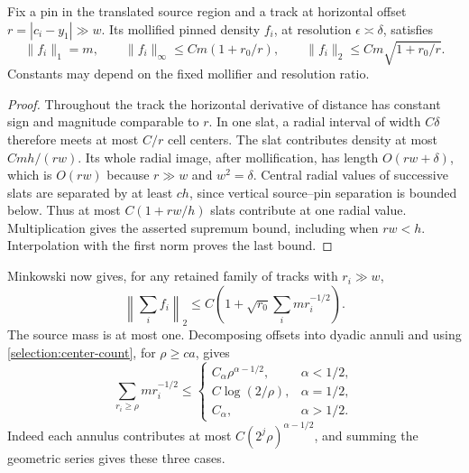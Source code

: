 \begin{lemma}\label{selection:one-track}
Fix a pin in the translated source region and a track at horizontal offset
\(r=|c_i-y_1|\gg w\). Its mollified pinned density \(f_i\), at
resolution \(\epsilon\asymp\delta\), satisfies
\[
 \|f_i\|_1=m,\qquad
 \|f_i\|_\infty\le Cm(1+r_0/r),\qquad
 \|f_i\|_2\le Cm\sqrt{1+r_0/r}.
\]
Constants may depend on the fixed mollifier and resolution ratio.
\end{lemma}
\begin{proof}
Throughout the track the horizontal derivative of distance has constant
sign and magnitude comparable to \(r\). In one slat, a radial interval
of width \(C\delta\) therefore meets at most \(C/r\) cell centers.
The slat contributes density at most \(Cm h/(rw)\).
Its whole radial image, after mollification, has length \(O(rw+\delta)\),
which is \(O(rw)\) because \(r\gg w\) and \(w^2=\delta\).
Central radial values of successive slats are separated by at least
\(ch\), since vertical source--pin separation is bounded below.
Thus at most \(C(1+rw/h)\) slats contribute at one radial value.
Multiplication gives the asserted supremum bound, including when
\(rw<h\). Interpolation with the first norm proves the last bound.
\end{proof}

Minkowski now gives, for any retained family of tracks with \(r_i\gg w\),
\begin{equation}\label{selection:half-potential}
 \left\|\sum_i f_i\right\|_2
 \le C\left(1+\sqrt{r_0}\sum_i m r_i^{-1/2}\right).
\end{equation}
The source mass is at most one. Decomposing offsets into dyadic annuli and
using \eqref{selection:center-count}, for \(\rho\ge ca\), gives
\begin{equation}\label{selection:potential}
 \sum_{r_i\ge\rho}m r_i^{-1/2}\le
 \begin{cases}
 C_\alpha\rho^{\alpha-1/2},&\alpha<1/2,\\
 C\log(2/\rho),&\alpha=1/2,\\
 C_\alpha,&\alpha>1/2.
 \end{cases}
\end{equation}
Indeed each annulus contributes at most \(C(2^j\rho)^{\alpha-1/2}\),
and summing the geometric series gives these three cases.


